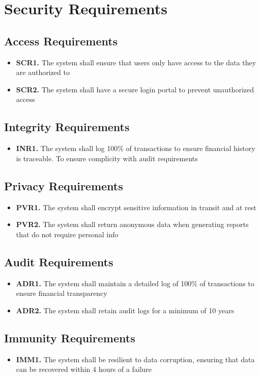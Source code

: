 \documentclass[12pt]{article}
\begin{document}
\section{Security Requirements}
\subsection{Access Requirements}
\begin{itemize}
    \item \textbf{SCR1. } The system shall ensure that users only have access to the data they are authorized to
    \item \textbf{SCR2. } The system shall have a secure login portal to prevent unauthorized access
\end{itemize}

\subsection{Integrity Requirements}
\begin{itemize}
    \item \textbf{INR1. } The system shall log 100\% of transactions to ensure financial history is traceable. To ensure complicity with audit requirements
\end{itemize}
\subsection{Privacy Requirements}
\begin{itemize}
    \item \textbf{PVR1. } The system shall encrypt sensitive information in transit and at rest
    \item \textbf{PVR2. } The system shall return anonymous data when generating reports that do not require personal info
\end{itemize}
\subsection{Audit Requirements}
\begin{itemize}
    \item \textbf{ADR1. } The system shall maintain a detailed log of 100\% of transactions to ensure financial transparency
    \item \textbf{ADR2. } The system shall retain audit logs for a minimum of 10 years
\end{itemize}
\subsection{Immunity Requirements}
\begin{itemize}
    \item \textbf{IMM1. } The system shall be resilient to data corruption, ensuring that data can be recovered within 4 hours of a failure
\end{itemize}
\end{document}
